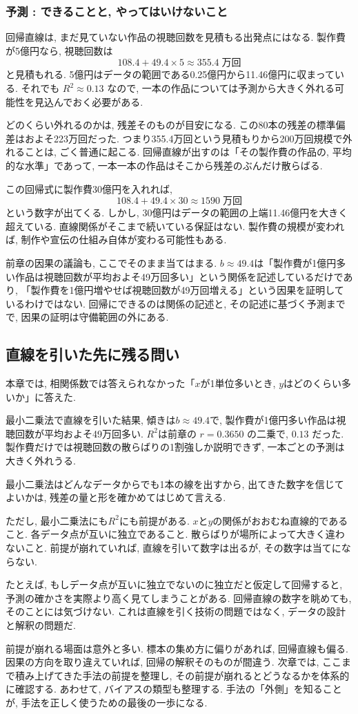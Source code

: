 \subsubsection*{予測 : できることと, やってはいけないこと}

回帰直線は, まだ見ていない作品の視聴回数を見積もる出発点にはなる.
製作費が5億円なら, 視聴回数は
\[
  108.4 + 49.4 \times 5 \approx 355.4\;\text{万回}
\]
と見積もれる.
5億円はデータの範囲である0.25億円から11.46億円に収まっている.
それでも $R^2 \approx 0.13$ なので, 一本の作品については予測から大きく外れる可能性を見込んでおく必要がある.

どのくらい外れるのかは, 残差そのものが目安になる.
この80本の残差の標準偏差はおよそ223万回だった.
つまり355.4万回という見積もりから200万回規模で外れることは, ごく普通に起こる.
回帰直線が出すのは「その製作費の作品の, 平均的な水準」であって, 一本一本の作品はそこから残差のぶんだけ散らばる.

この回帰式に製作費30億円を入れれば,
\[
  108.4 + 49.4 \times 30 \approx 1590\;\text{万回}
\]
という数字が出てくる.
しかし, 30億円はデータの範囲の上端11.46億円を大きく超えている.
直線関係がそこまで続いている保証はない.
製作費の規模が変われば, 制作や宣伝の仕組み自体が変わる可能性もある.

前章の因果の議論も, ここでそのまま当てはまる.
$b \approx 49.4$は「製作費が1億円多い作品は視聴回数が平均およそ49万回多い」という関係を記述しているだけであり, 「製作費を1億円増やせば視聴回数が49万回増える」という因果を証明しているわけではない.
回帰にできるのは関係の記述と, その記述に基づく予測までで, 因果の証明は守備範囲の外にある.


\subsection{直線を引いた先に残る問い}

本章では, 相関係数では答えられなかった「$x$が1単位多いとき, $y$はどのくらい多いか」に答えた.

最小二乗法で直線を引いた結果, 傾きは$b \approx 49.4$で, 製作費が1億円多い作品は視聴回数が平均およそ49万回多い.
$R^2$は前章の $r = 0.3650$ の二乗で, $0.13$ だった.
製作費だけでは視聴回数の散らばりの1割強しか説明できず, 一本ごとの予測は大きく外れうる.

最小二乗法はどんなデータからでも1本の線を出すから, 出てきた数字を信じてよいかは, 残差の量と形を確かめてはじめて言える.

ただし, 最小二乗法にも$R^2$にも前提がある.
$x$と$y$の関係がおおむね直線的であること.
各データ点が互いに独立であること.
散らばりが場所によって大きく違わないこと.
前提が崩れていれば, 直線を引いて数字は出るが, その数字は当てにならない.

たとえば, もしデータ点が互いに独立でないのに独立だと仮定して回帰すると, 予測の確かさを実際より高く見てしまうことがある.
回帰直線の数字を眺めても, そのことには気づけない.
これは直線を引く技術の問題ではなく, データの設計と解釈の問題だ.

前提が崩れる場面は意外と多い.
標本の集め方に偏りがあれば, 回帰直線も偏る.
因果の方向を取り違えていれば, 回帰の解釈そのものが間違う.
次章では, ここまで積み上げてきた手法の前提を整理し, その前提が崩れるとどうなるかを体系的に確認する.
あわせて, バイアスの類型も整理する.
手法の「外側」を知ることが, 手法を正しく使うための最後の一歩になる.
